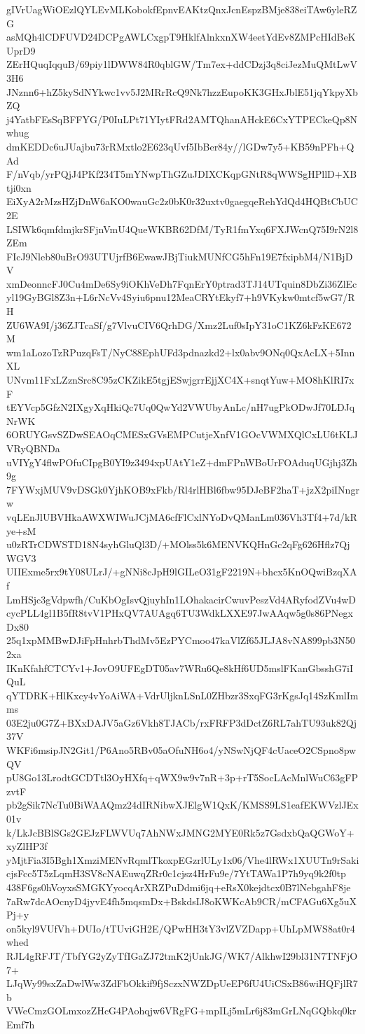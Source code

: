 gIVrUagWiOEzlQYLEvMLKobokfEpnvEAKtzQnxJcnEspzBMje838eiTAw6yleRZG
asMQh4lCDFUVD24DCPgAWLCxgpT9HklfAlnkxnXW4eetYdEv8ZMPcHIdBeKUprD9
ZErHQuqIqquB/69piy1lDWW84R0qblGW/Tm7ex+ddCDzj3q8ciJezMuQMtLwV3H6
JNznn6+hZ5kySdNYkwc1vv5J2MRrRcQ9Nk7hzzEupoKK3GHxJblE51jqYkpyXbZQ
j4YatbFEsSqBFFYG/P0IuLPt71YIytFRd2AMTQhanAHckE6CxYTPECkeQp8Nwhug
dmKEDDc6uJUajbu73rRMxtlo2E623qUvf5IbBer84y//lGDw7y5+KB59nPFh+QAd
F/nVqb/yrPQjJ4PKf234T5mYNwpThGZuJDIXCKqpGNtR8qWWSgHPllD+XBtji0xn
EiXyA2rMzsHZjDnW6aKO0wauGc2z0bK0r32uxtv0gaegqeRehYdQd4HQBtCbUC2E
LSIWk6qmfdmjkrSFjnVmU4QueWKBR62DfM/TyR1fmYxq6FXJWcnQ75I9rN2l8ZEm
FIcJ9Nleb80uBrO93UTUjrfB6EwawJBjTiukMUNfCG5hFn19E7fxipbM4/N1BjDV
xmDeonncFJ0Cu4mDe6Sy9iOKhVeDh7FqnErY0ptrad3TJ14UTquin8DbZi36ZlEc
yl19GyBGl8Z3n+L6rNcVv4Syiu6pnu12MeaCRYtEkyf7+h9VKykw0mtcf5wG7/RH
ZU6WA9I/j36ZJTcaSf/g7VlvuCIV6QrhDG/Xmz2Luf0sIpY31oC1KZ6kFzKE672M
wm1aLozoTzRPuzqFsT/NyC88EphUFd3pdnazkd2+lx0abv9ONq0QxAcLX+5InnXL
UNvm11FxLZznSrc8C95zCKZikE5tgjESwjgrrEjjXC4X+snqtYuw+MO8hKlRI7xF
tEYVcp5GfzN2IXgyXqHkiQc7Uq0QwYd2VWUbyAnLc/nH7ugPkODwJf70LDJqNrWK
6ORUYGsvSZDwSEAOqCMESxGVsEMPCutjeXnfV1GOcVWMXQlCxLU6tKLJVRyQBNDa
uVIYgY4flwPOfuCIpgB0YI9z3494xpUAtY1eZ+dmFPnWBoUrFOAduqUGjhj3Zh9g
7FYWxjMUV9vDSGk0YjhKOB9xFkb/Rl4rlHBl6fbw95DJeBF2haT+jzX2piINngrw
vqLEnJlUBVHkaAWXWIWuJCjMA6cfFlCxlNYoDvQManLm036Vh3Tf4+7d/kRye+sM
u0zRTrCDWSTD18N4syhGluQl3D/+MOlss5k6MENVKQHnGc2qFg626Hflz7QjWGV3
UIIExme5rx9tY08ULrJ/+gNNi8cJpH9lGILeO31gF2219N+bhcx5KnOQwiBzqXAf
LmHSjc3gVdpwfh/CuKbOgIsvQjuyhIn1LOhakacirCwuvPeszVd4ARyfodZVu4wD
cycPLL4gl1B5fR8tvV1PHxQV7AUAgq6TU3WdkLXXE97JwAAqw5g0s86PNegxDx80
25q1xpMMBwDJiFpHnhrbThdMv5EzPYCmoo47kaVlZf65JLJA8vNA899pb3N502xa
IKnKfahfCTCYv1+JovO9UFEgDT05av7WRu6Qe8kHf6UD5mslFKanGbsshG7iIQuL
qYTDRK+HlKxcy4vYoAiWA+VdrUljknLSnL0ZHbzr3SxqFG3rKgsJq14SzKmlImms
03E2ju0G7Z+BXxDAJV5aGz6Vkh8TJACb/rxFRFP3dDctZ6RL7ahTU93uk82Qj37V
WKFi6msipJN2Git1/P6Ano5RBv05aOfuNH6o4/yNSwNjQF4cUaceO2CSpno8pwQV
pU8Go13LrodtGCDTtl3OyHXfq+qWX9w9v7nR+3p+rT5SocLAcMnlWuC63gFPzvtF
pb2gSik7NcTu0BiWAAQmz24dIRNibwXJElgW1QxK/KMSS9LS1eafEKWVzlJEx01v
k/LkJcBBlSGs2GEJzFLWVUq7AhNWxJMNG2MYE0Rk5z7GsdxbQaQGWoY+xyZlHP3f
yMjtFia3I5Bgh1XmziMENvRqmlTkoxpEGzrlULy1x06/Vhe4lRWx1XUUTn9rSaki
cjsFcc5T5zLqmH3SV8cNAEuwqZRr0c1cjsz4HrFu9e/7YtTAWa1P7h9yq9k2f0tp
438F6gs0hVoyxsSMGKYyocqArXRZPuDdmi6jq+eRsX0kejdtcx0B7lNebgahF8je
7aRw7dcAOcnyD4jyvE4fh5mqsmDx+BskdsIJ8oKWKcAb9CR/mCFAGu6Xg5uXPj+y
on5kyl9VUfVh+DUIo/tTUviGH2E/QPwHH3tY3vlZVZDapp+UhLpMWS8at0r4whed
RJL4gRFJT/TbfYG2yZyTfIGaZJ72tmK2jUnkJG/WK7/AlkhwI29bl31N7TNFjO7+
LJqWy99sxZaDwlWw3ZdFbOkkif9fjSczxNWZDpUeEP6fU4UiCSxB86wiHQFjlR7b
VWeCmzGOLmxozZHcG4PAohqjw6VRgFG+mpILj5mLr6j83mGrLNqGQbkq0krEmf7h

